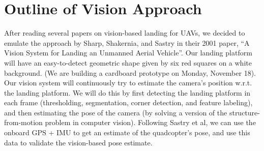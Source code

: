 \documentclass[10pt, twocolumn]{scrartcl} %
\begin{document}
\section{Outline of Vision Approach}

After reading several papers on vision-based landing for UAVs, we decided to
emulate the approach by Sharp, Shakernia, and Sastry in their 2001 paper, ``A
Vision System for Landing an Unmanned Aerial Vehicle''. Our landing platform
will have an easy-to-detect geometric shape given by six red squares on a white
background. (We are building a cardboard prototype on Monday, November 18). Our
vision system will continuously try to estimate the camera's position w.r.t.
the landing platform. We will do this by first detecting the landing platform
in each frame (thresholding, segmentation, corner detection, and feature
labeling), and then estimating the pose of the camera (by solving a version of
the structure-from-motion problem in computer vision). Following Sastry et al,
we can use the onboard GPS + IMU to get an estimate of the quadcopter's pose,
and use this data to validate the vision-based pose estimate.
\end{document}
